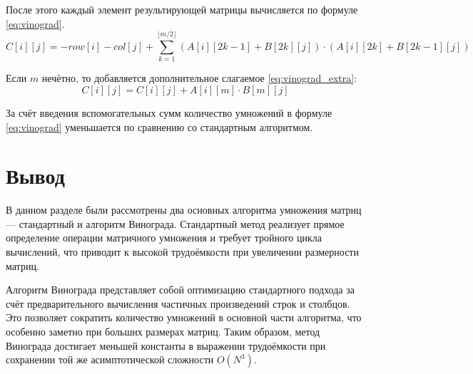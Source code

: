 После этого каждый элемент результирующей матрицы вычисляется по формуле \eqref{eq:vinograd}.
\begin{equation} \label{eq:vinograd}
	C[i][j] = -row[i] - col[j] + \sum_{k=1}^{\lfloor m/2 \rfloor} (A[i][2k-1] + B[2k][j]) \cdot (A[i][2k] + B[2k-1][j])
\end{equation}

Если $m$ нечётно, то добавляется дополнительное слагаемое \eqref{eq:vinograd_extra}:
\begin{equation} \label{eq:vinograd_extra}
	C[i][j] = C[i][j] + A[i][m]\cdot B[m][j]
\end{equation}

За счёт введения вспомогательных сумм количество умножений в формуле \eqref{eq:vinograd} уменьшается по сравнению со стандартным алгоритмом.

\section*{Вывод}

В данном разделе были рассмотрены два основных алгоритма умножения матриц — стандартный и алгоритм Винограда. Стандартный метод реализует прямое определение операции матричного умножения и требует тройного цикла вычислений, что приводит к высокой трудоёмкости при увеличении размерности матриц.

Алгоритм Винограда представляет собой оптимизацию стандартного подхода за счёт предварительного вычисления частичных произведений строк и столбцов. Это позволяет сократить количество умножений в основной части алгоритма, что особенно заметно при больших размерах матриц. Таким образом, метод Винограда достигает меньшей константы в выражении трудоёмкости при сохранении той же асимптотической сложности $O(N^3)$.






\clearpage

